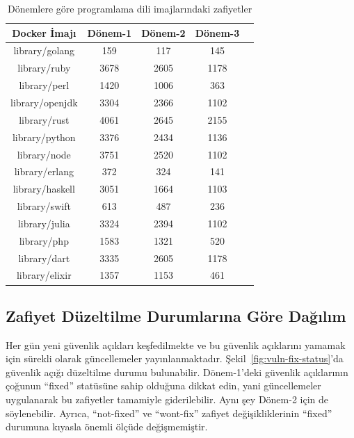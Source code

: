 \begin{table}[!htbp]
    \caption{Dönemlere göre programlama dili imajlarındaki zafiyetler}\label{tab:proglang-by-periods}
    \centering
    \begin{tabular}{ |c|c|c|c|c| }
        \hline
        Docker İmajı & Dönem-1 & Dönem-2 & Dönem-3 \\
        \hline
        library/golang  &  159 &  117 &  145 \\
        library/ruby    & 3678 & 2605 & 1178 \\
        library/perl    & 1420 & 1006 &  363 \\
        library/openjdk & 3304 & 2366 & 1102 \\
        library/rust    & 4061 & 2645 & 2155 \\
        library/python  & 3376 & 2434 & 1136 \\
        library/node    & 3751 & 2520 & 1102 \\
        library/erlang  &  372 &  324 &  141 \\
        library/haskell & 3051 & 1664 & 1103 \\
        library/swift   &  613 &  487 &  236 \\
        library/julia   & 3324 & 2394 & 1102 \\
        library/php     & 1583 & 1321 &  520 \\
        library/dart    & 3335 & 2605 & 1178 \\
        library/elixir  & 1357 & 1153 &  461 \\
        \hline
    \end{tabular}
\end{table}

\subsection{Zafiyet Düzeltilme Durumlarına Göre Dağılım}\label{subsec:fix-status}

Her gün yeni güvenlik açıkları keşfedilmekte ve bu güvenlik açıklarını yamamak için sürekli olarak güncellemeler yayınlanmaktadır. Şekil~\ref{fig:vuln-fix-status}'da güvenlik açığı düzeltilme durumu bulunabilir. Dönem-1'deki güvenlik açıklarının çoğunun ``fixed'' statüsüne sahip olduğuna dikkat edin, yani güncellemeler uygulanarak bu zafiyetler tamamiyle giderilebilir. Aynı şey Dönem-2 için de söylenebilir. Ayrıca, ``not-fixed'' ve ``wont-fix'' zafiyet değişikliklerinin ``fixed'' durumuna kıyasla önemli ölçüde değişmemiştir.

